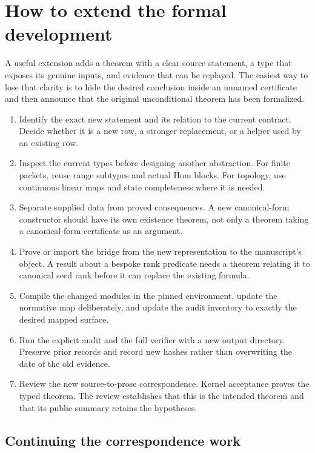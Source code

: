 \documentclass[11pt,a4paper]{article}
\begin{document}
\section{How to extend the formal development}

A useful extension adds a theorem with a clear source statement, a type that exposes its genuine inputs, and evidence that can be replayed. The easiest way to lose that clarity is to hide the desired conclusion inside an unnamed certificate and then announce that the original unconditional theorem has been formalized.

\begin{enumerate}
\item Identify the exact new statement and its relation to the current contract. Decide whether it is a new row, a stronger replacement, or a helper used by an existing row.
\item Inspect the current types before designing another abstraction. For finite packets, reuse range subtypes and actual Hom blocks. For topology, use continuous linear maps and state completeness where it is needed.
\item Separate supplied data from proved consequences. A new canonical-form constructor should have its own existence theorem, not only a theorem taking a canonical-form certificate as an argument.
\item Prove or import the bridge from the new representation to the manuscript's object. A result about a bespoke rank predicate needs a theorem relating it to canonical seed rank before it can replace the existing formula.
\item Compile the changed modules in the pinned environment, update the normative map deliberately, and update the audit inventory to exactly the desired mapped surface.
\item Run the explicit audit and the full verifier with a new output directory. Preserve prior records and record new hashes rather than overwriting the date of the old evidence.
\item Review the new source-to-prose correspondence. Kernel acceptance proves the typed theorem. The review establishes that this is the intended theorem and that its public summary retains the hypotheses.
\end{enumerate}

\subsection{Continuing the correspondence work}
\end{document}
